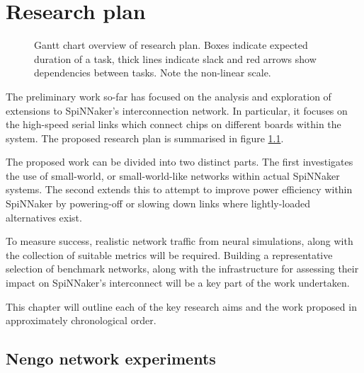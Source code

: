 \chapter{Research plan}
	\label{sec:research-plan}
	
	
	\begin{figure}[b!]
		\center
		
		\caption[Gantt chart overview of research plan.]{Gantt chart overview of
		research plan. Boxes indicate expected duration of a task, thick lines
		indicate slack and red arrows show dependencies between tasks. Note the
		non-linear scale.}
		\label{fig:plan-gantt}
	\end{figure}
	
	The preliminary work so-far has focused on the analysis and exploration of
	extensions to SpiNNaker's interconnection network. In particular, it focuses
	on the high-speed serial links which connect chips on different boards within
	the system. The proposed research plan is summarised in figure
	\ref{fig:plan-gantt}.
	
	The proposed work can be divided into two distinct parts. The first
	investigates the use of small-world, or small-world-like networks within
	actual SpiNNaker systems. The second extends this to attempt to improve power
	efficiency within SpiNNaker by powering-off or slowing down links where
	lightly-loaded alternatives exist.
	
	To measure success, realistic network traffic from neural simulations, along
	with the collection of suitable metrics will be required. Building a
	representative selection of benchmark networks, along with the infrastructure
	for assessing their impact on SpiNNaker's interconnect will be a key part of
	the work undertaken.
	
	This chapter will outline each of the key research aims and the work proposed
	in approximately chronological order.
	
	\section{Nengo network experiments}
		
